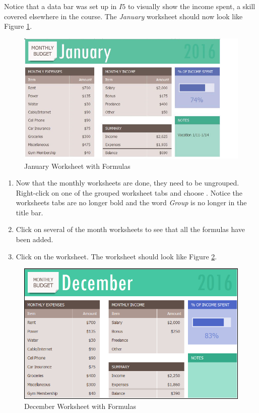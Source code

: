 Notice that a data bar was set up in $ I5 $ to visually show the income spent, a skill covered elsewhere in the course. The \textit{January} worksheet should now look like Figure \ref{06:fig05}.

\begin{figure}[H]
	\centering
	\includegraphics[width=\maxwidth{.95\linewidth}]{gfx/ch06_fig05}
	\caption{January Worksheet with Formulas}
	\label{06:fig05}
\end{figure}

\begin{enumbox}
	\begin{enumerate}
		\item Now that the monthly worksheets are done, they need to be ungrouped. Right-click on one of the grouped worksheet tabs and choose . Notice the worksheets tabs are no longer bold and the word \textit{Group} is no longer in the title bar.
		\item Click on several of the month worksheets to see that all the formulas have been added.
		\item Click on the  worksheet. The worksheet should look like Figure \ref{06:fig06}.
	\end{enumerate}
\end{enumbox}
	
\begin{figure}[H]
	\centering
	\includegraphics[width=\maxwidth{.95\linewidth}]{gfx/ch06_fig06}
	\caption{December Worksheet with Formulas}
	\label{06:fig06}
\end{figure}

